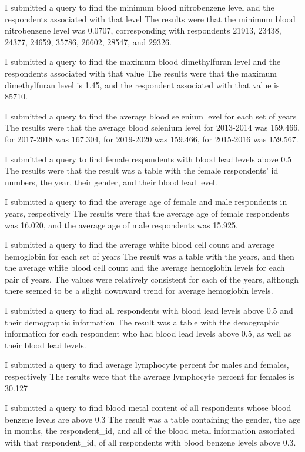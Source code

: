 \documentclass[]{article}
\begin{document}
I submitted a query to find the minimum blood nitrobenzene level and the respondents associated with that level
The results were that the minimum blood nitrobenzene level was 0.0707, corresponding with respondents 21913, 23438, 24377, 24659, 35786, 26602, 28547, and 29326.

I submitted a query to find the maximum blood dimethylfuran level and the respondents associated with that value
The results were that the maximum dimethylfuran level is 1.45, and the respondent associated with that value is 85710.

I submitted a query to find the average blood selenium level for each set of years
The results were that the average blood selenium level for 2013-2014 was 159.466, for 2017-2018 was 167.304, for 2019-2020 was 159.466, for 2015-2016 was 159.567.

I submitted a query to find female respondents with blood lead levels above 0.5
The results were that the result was a table with the female respondents’ id numbers, the year, their gender, and their blood lead level. 

I submitted a query to find the average age of female and male respondents in years, respectively
The results were that the average age of female respondents was 16.020, and the average age of male respondents was 15.925. 

I submitted a query to find the average white blood cell count and average hemoglobin for each set of years
The result was a table with the years, and then the average white blood cell count and the average hemoglobin levels for each pair of years. The values were relatively consistent for each of the years, although there seemed to be a slight downward trend for average hemoglobin levels. 

I submitted a query to find all respondents with blood lead levels above 0.5 and their demographic information
The result was a table with the demographic information for each respondent who had blood lead levels above 0.5, as well as their blood lead levels. 

I submitted a query to find average lymphocyte percent for males and females, respectively
The results were that the average lymphocyte percent for females is 30.127%

I submitted a query to find blood metal content of all respondents whose blood benzene levels are above 0.3
The result was a table containing the gender, the age in months, the respondent\_id, and all of the blood metal information associated with that respondent\_id, of all respondents with blood benzene levels above 0.3. 
\end{document}
